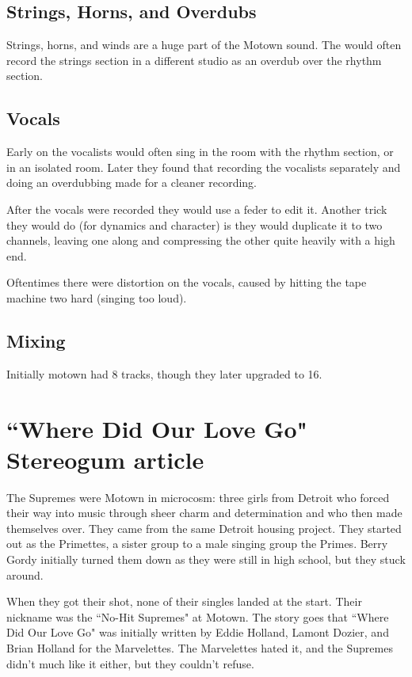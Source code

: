 \documentclass[12pt, a4paper, twoside, openright, titlepage]{book}
\begin{document}
\subsection{Strings, Horns, and Overdubs}

Strings, horns, and winds are a huge part of the Motown sound. The would often record the strings section in a different studio as an overdub over the rhythm section.

\subsection{Vocals}

Early on the vocalists would often sing in the room with the rhythm section, or in an isolated room. Later they found that recording the vocalists separately and doing an overdubbing made for a cleaner recording.

After the vocals were recorded they would use a feder to edit it. Another trick they would do (for dynamics and character) is they would duplicate it to two channels, leaving one along and compressing the other quite heavily with a high end.

Oftentimes there were distortion on the vocals, caused by hitting the tape machine two hard (singing too loud). 


\subsection{Mixing}

Initially motown had 8 tracks, though they later upgraded to 16. 


\section{``Where Did Our Love Go" Stereogum article}

The Supremes were Motown in microcosm: three girls from Detroit who forced their way into music through sheer charm and determination and who then made themselves over. They came from the same Detroit housing project. They started out as the Primettes, a sister group to a male singing group the Primes. Berry Gordy initially turned them down as they were still in high school, but they stuck around. 

When they got their shot, none of their singles landed at the start. Their nickname was the ``No-Hit Supremes" at Motown. The story goes that ``Where Did Our Love Go" was initially written by Eddie Holland, Lamont Dozier, and Brian Holland for the Marvelettes. The Marvelettes hated it, and the Supremes didn't much like it either, but they couldn't refuse. 
\end{document}
